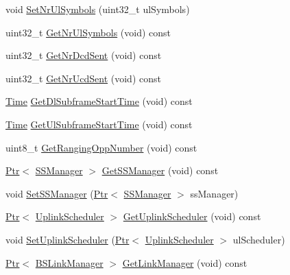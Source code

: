 \begin{DoxyCompactItemize}
\item 
void \hyperlink{classns3_1_1BaseStationNetDevice_a8f53d76424bfbbed72d72ece5f76336c}{Set\+Nr\+Ul\+Symbols} (uint32\+\_\+t ul\+Symbols)
\item 
uint32\+\_\+t \hyperlink{classns3_1_1BaseStationNetDevice_aaf208a4b7112ba7ea063bc0add125ea3}{Get\+Nr\+Ul\+Symbols} (void) const 
\item 
uint32\+\_\+t \hyperlink{classns3_1_1BaseStationNetDevice_a0bc2d31b412144e956b3c1e7f6813ce6}{Get\+Nr\+Dcd\+Sent} (void) const 
\item 
uint32\+\_\+t \hyperlink{classns3_1_1BaseStationNetDevice_a69a7571c94b46324d00261a15ff534c3}{Get\+Nr\+Ucd\+Sent} (void) const 
\item 
\hyperlink{classns3_1_1Time}{Time} \hyperlink{classns3_1_1BaseStationNetDevice_afbda4c852bb6d80f62a9cbde49316b03}{Get\+Dl\+Subframe\+Start\+Time} (void) const 
\item 
\hyperlink{classns3_1_1Time}{Time} \hyperlink{classns3_1_1BaseStationNetDevice_ac9f74ebd3267519b6a09e9688e6c0e06}{Get\+Ul\+Subframe\+Start\+Time} (void) const 
\item 
uint8\+\_\+t \hyperlink{classns3_1_1BaseStationNetDevice_a181ba903947abf0ceee44107850ea2da}{Get\+Ranging\+Opp\+Number} (void) const 
\item 
\hyperlink{classns3_1_1Ptr}{Ptr}$<$ \hyperlink{classns3_1_1SSManager}{S\+S\+Manager} $>$ \hyperlink{classns3_1_1BaseStationNetDevice_afb45a043d6764f46a347d46915491e63}{Get\+S\+S\+Manager} (void) const 
\item 
void \hyperlink{classns3_1_1BaseStationNetDevice_a921d119b9954e089d10c32f2f665d4f5}{Set\+S\+S\+Manager} (\hyperlink{classns3_1_1Ptr}{Ptr}$<$ \hyperlink{classns3_1_1SSManager}{S\+S\+Manager} $>$ ss\+Manager)
\item 
\hyperlink{classns3_1_1Ptr}{Ptr}$<$ \hyperlink{classns3_1_1UplinkScheduler}{Uplink\+Scheduler} $>$ \hyperlink{classns3_1_1BaseStationNetDevice_a68899b936f7a8c294d6925e5b2162bf1}{Get\+Uplink\+Scheduler} (void) const 
\item 
void \hyperlink{classns3_1_1BaseStationNetDevice_aa6a2b9f075d44384e600fae0e771f0d8}{Set\+Uplink\+Scheduler} (\hyperlink{classns3_1_1Ptr}{Ptr}$<$ \hyperlink{classns3_1_1UplinkScheduler}{Uplink\+Scheduler} $>$ ul\+Scheduler)
\item 
\hyperlink{classns3_1_1Ptr}{Ptr}$<$ \hyperlink{classns3_1_1BSLinkManager}{B\+S\+Link\+Manager} $>$ \hyperlink{classns3_1_1BaseStationNetDevice_a117bfefcc35c47cb4fd564e77d2bc7e0}{Get\+Link\+Manager} (void) const 
\item 

\end{DoxyCompactItemize}
